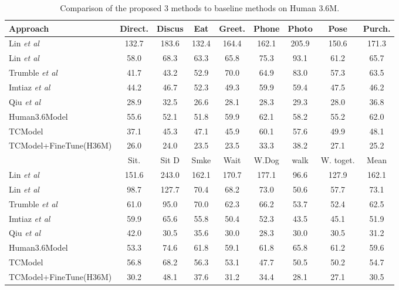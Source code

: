 \documentclass{bmvc2k}
\newcommand{\squeezeup}{\vspace{-2mm}}
\begin{document}
\begin{table*}[htb]
\centering
{
\small
\begin{tabular}{lcccccccc}
\hline
Approach                              & Direct. & Discus & Eat & Greet. &Phone &Photo &Pose &Purch. \\ \hline
Lin \emph{et al}~\cite{li2015maximumH36m}          & 132.7& 183.6 & 132.4& 164.4 &162.1&205.9&150.6 &171.3 \\
Lin \emph{et al}~\cite{lin2017CVPRRPSM}              &58.0    & 68.3 & 63.3 &65.8  & 75.3 &93.1&61.2&65.7 \\ 
Trumble \emph{et al}~\cite{trumble:eccv:2018}        & 41.7& 43.2& 52.9& 70.0& 64.9& 83.0& 57.3& 63.5\\ 
Imtiaz \emph{et al}~\cite{hossain2018exploiting}     &44.2 &46.7 &52.3 &49.3 &59.9 &59.4 &47.5 &46.2 \\  
Qiu \emph{et al}~\cite{Qiu:iccv:2019}                &28.9 &32.5 &26.6& 28.1 &28.3 &29.3 & 28.0& 36.8 \\ \hline
Human3.6Model                           &55.6 &52.1 &51.8 &59.9 &62.1 &58.2 &55.2 &62.0                      \\
TCModel                       &37.1 &45.3 &47.1 &45.9 &60.1 &57.6 &49.9 &48.1                       \\
TCModel+FineTune(H36M)             &26.0 &24.0 &23.5 & 23.5 & 33.3 & 38.2 & 27.1 &25.2 \\ \hline

                                        & Sit. & Sit D & Smke & Wait &W.Dog& walk & W. toget. &Mean\\\hline
Lin \emph{et al}~\cite{li2015maximumH36m}            & 151.6 & 243.0 & 162.1 &170.7 &177.1& 96.6 & 127.9 & 162.1 \\
Lin \emph{et al}~\cite{lin2017CVPRRPSM}              &98.7 &127.7 &70.4 &68.2   & 73.0 & 50.6 & 57.7 & 73.1 \\ 
Trumble \emph{et al}~\cite{trumble:eccv:2018}        &61.0 &95.0 &70.0 &62.3 &66.2 &53.7 &52.4 &62.5 \\     
Imtiaz \emph{et al}~\cite{hossain2018exploiting}     &59.9 & 65.6 &55.8 &50.4 &52.3 &43.5 &45.1 &51.9 \\     
Qiu \emph{et al}~\cite{Qiu:iccv:2019}                &42.0 & 30.5 &35.6 &30.0 &28.3 &30.0 &30.5 &31.2 \\ \hline
Human3.6Model                           &53.3 & 74.6 &61.8 & 59.1 &61.8 & 65.8 & 61.2 & 59.6  \\   
TCModel                       &56.8 &68.2 & 56.3 & 53.1 &47.7 & 50.5 & 50.2 & 54.7   \\
TCModel+FineTune(H36M)             &30.2 &48.1 & 37.6 &31.2 & 34.4 & 28.1 & 27.1 & 30.5     \\ \hline
\end{tabular}}
\caption{Comparison of the proposed 3 methods to baseline methods on  Human 3.6M.}
\label{tab:H36mResults}
\squeezeup
\end{table*}
\end{document}
